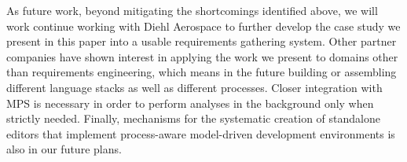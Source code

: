 As future work, beyond mitigating the shortcomings identified above, we will
work continue working with Diehl Aerospace to further develop the case study we
present in this paper into a usable requirements gathering system. Other partner companies
have shown interest in applying the work we present to domains other than
requirements engineering, which means in the future building or assembling
different language stacks as well as different processes. Closer integration
with MPS is necessary in order to perform analyses in the background only when
strictly needed. Finally, mechanisms for the systematic creation of standalone
editors that implement process-aware model-driven development environments
is also in our future plans.
 \vspace{-.6cm}
